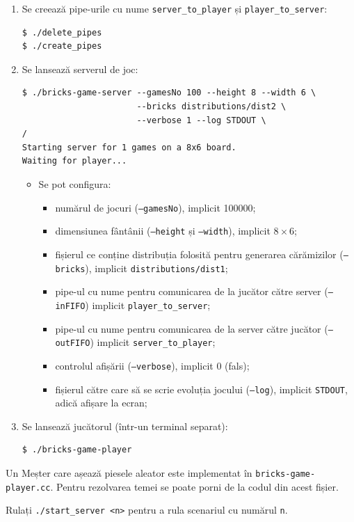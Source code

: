 \documentclass[12pt]{article}
\begin{document}
\begin{enumerate}
\item Se creează pipe-urile cu nume \texttt{server\_to\_player} și
  \texttt{player\_to\_server}:
\begin{verbatim}
$ ./delete_pipes
$ ./create_pipes
\end{verbatim}
\item Se lansează serverul de joc:
\begin{verbatim}
$ ./bricks-game-server --gamesNo 100 --height 8 --width 6 \
                       --bricks distributions/dist2 \
                       --verbose 1 --log STDOUT \
/
Starting server for 1 games on a 8x6 board.
Waiting for player...
\end{verbatim}
  \begin{itemize}
  \item Se pot configura:
    \begin{itemize}
    \item numărul de jocuri (\texttt{--gamesNo}), implicit 100000;
    \item dimensiunea fântânii (\texttt{--height} și
      \texttt{--width}), implicit $8\times 6$;
    \item fișierul ce conține distribuția folosită pentru generarea
      cărămizilor (\texttt{--bricks}), implicit
      \texttt{distributions/dist1};
    \item pipe-ul cu nume pentru comunicarea de la jucător către
      server (\texttt{--inFIFO}) implicit \texttt{player\_to\_server};
    \item pipe-ul cu nume pentru comunicarea de la server către
      jucător (\texttt{--outFIFO}) implicit
      \texttt{server\_to\_player};
    \item controlul afișării (\texttt{--verbose}), implicit 0 (fals);
    \item fișierul către care să se scrie evoluția jocului
      (\texttt{--log}), implicit \texttt{STDOUT}, adică afișare la
      ecran;
    \end{itemize}
  \end{itemize}
\item Se lansează jucătorul (într-un terminal separat):
\begin{verbatim}
$ ./bricks-game-player
\end{verbatim}
\end{enumerate}

Un Meșter care așează piesele aleator este implementat în
\texttt{bricks-game-player.cc}. Pentru rezolvarea temei se poate porni
de la codul din acest fișier.

Rulați \verb|./start_server <n>| pentru a rula scenariul cu numărul
\texttt{n}.

%
%
\end{document}
